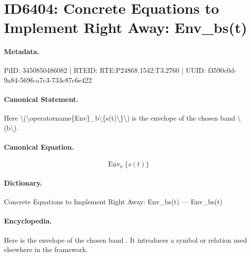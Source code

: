 \section*{ID6404: Concrete Equations to Implement Right Away: Env\_bs(t)}
\paragraph{Metadata.}
PiID: 3450850486082 | RTEID: RTE:P24868.1542:T3.2760 | UUID: f3590c0d-9a84-5696-a7c3-733c87c6e422

\paragraph{Canonical Statement.}
Here \textbackslash{}(\textbackslash{}operatorname\{Env\}\_b\textbackslash{}\{s(t)\textbackslash{}\}\textbackslash{}) is the envelope of the chosen band \textbackslash{}(b\textbackslash{}).

\paragraph{Canonical Equation.}
\[
\operatorname{Env}_b\{s(t)\}
\]

\paragraph{Dictionary.}
Concrete Equations to Implement Right Away: Env\_bs(t) — Env\_bs(t)

\paragraph{Encyclopedia.}
Here is the envelope of the chosen band . It introduces a symbol or relation used elsewhere in the framework.
